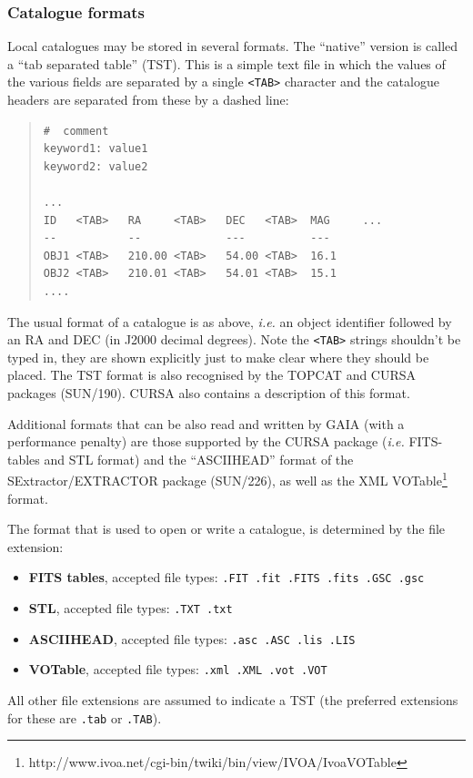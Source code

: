 \documentclass[twoside,11pt]{article}
\newcommand{\htmladdnormallinkfoot}[2]{#1\footnote{#2}}
\newcommand{\xref}[3]{#1}
\renewcommand{\_}{\texttt{\symbol{95}}}
\newcommand{\mytt}[1]{{\texttt{#1}}}
\newcommand{\mybold}[1]{{\textbf{#1}}}
\begin{document}
\subsubsection{Catalogue formats}
Local catalogues may be stored in several formats. The ``native''
version is called a ``tab separated table'' (TST). This is a simple
text file in which the values of the various fields are separated by a
single \mytt{<TAB>} character and the catalogue headers are separated
from these by a dashed line:
\begin{quote}
\begin{verbatim}
#  comment
keyword1: value1
keyword2: value2

...
ID   <TAB>   RA     <TAB>   DEC   <TAB>  MAG     ...
--           --             ---          ---
OBJ1 <TAB>   210.00 <TAB>   54.00 <TAB>  16.1
OBJ2 <TAB>   210.01 <TAB>   54.01 <TAB>  15.1
....
\end{verbatim}
\end{quote}
The usual format of a catalogue is as above, \textit{i.e.} an object identifier
followed by an RA and DEC (in J2000 decimal degrees). Note the
\mytt{<TAB>} strings shouldn't be typed in, they are shown explicitly
just to make clear where they should be placed. The TST format is also
recognised by the TOPCAT and CURSA packages (\xref{SUN/190}{sun190}{}).
CURSA also contains a description of this format.

Additional formats that can be also read and written by GAIA (with a
performance penalty) are those supported by the \xref{CURSA}{sun190}{}
package (\textit{i.e.} FITS-tables and STL format) and the
``ASCII\_HEAD'' format of the SExtractor/EXTRACTOR package
(\xref{SUN/226}{sun226}{}), as well as the XML
\htmladdnormallinkfoot{VOTable}{http://www.ivoa.net/cgi-bin/twiki/bin/view/IVOA/IvoaVOTable}
format.

The format that is used to open or write a catalogue, is determined by
the file extension:
\begin{itemize}
\item \mybold{FITS tables}, accepted file types: \mytt{.FIT .fit .FITS .fits .GSC .gsc}
\item \mybold{STL}, accepted file types: \mytt{.TXT .txt}
\item \mybold{ASCII\_HEAD}, accepted file types: \mytt{.asc .ASC .lis .LIS}
\item \mybold{VOTable}, accepted file types: \mytt{.xml .XML .vot .VOT}
\end{itemize}
All other file extensions are assumed to indicate a TST (the preferred
extensions for these are \mytt{.tab} or \mytt{.TAB}).
\end{document}
